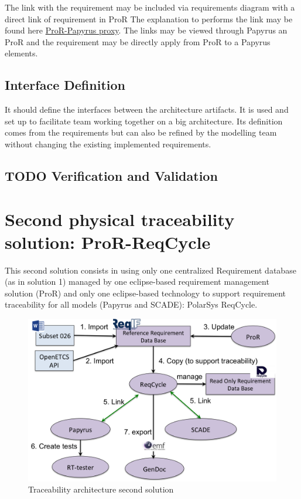 \documentclass[11pt]{template/openetcs_report}
\begin{document}
The link with the requirement may be included via requirements diagram with a
direct link of requirement in ProR
The explanation to performs the link may be found here \href{https://github.com/openETCS/toolchain/wiki/User-Documentation#tracing-requirements-and-sysml-models}{ProR-Papyrus proxy}.
The links may be viewed through Papyrus an ProR and the requirement may be
directly apply from ProR to a Papyrus elements.


\section{Interface Definition}
\label{sec-9}

It should define the interfaces between the architecture artifacts.  It is used and
set up to facilitate team working together on a big architecture. Its definition
comes from the requirements but can also be refined by the modelling team without
changing the existing implemented requirements.



\section{{\bfseries\sffamily TODO} Verification and Validation}
\label{sec-11}

\chapter{Second physical traceability solution: ProR-ReqCycle}
\label{sec-6}

This second solution consists in using only one centralized Requirement database (as in solution 1) managed by one eclipse-based requirement management solution (ProR) and only one eclipse-based technology to support requirement traceability for all models (Papyrus and SCADE): PolarSys ReqCycle.

\begin{figure}[htb]
\centering
\includegraphics[width=.9\linewidth]{images/second_trace_solution-ProR-ReqCycle.png}
\caption{\label{fig:trace_second}Traceability architecture second solution}
\end{figure}
\end{document}
